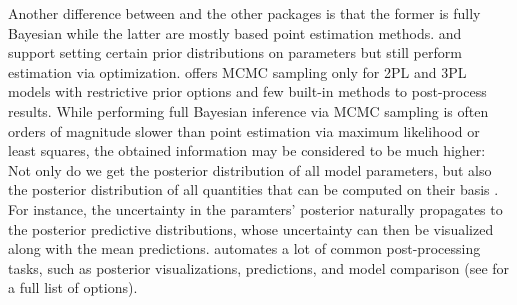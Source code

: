 \documentclass[jss]{jss}
\begin{document}
Another difference between  and the other packages is that the
former is fully Bayesian while the latter are mostly based point
estimation methods.  and  support setting certain
prior distributions on parameters but still perform estimation via
optimization.  offers MCMC sampling only for 2PL and 3PL
models with restrictive prior options and few built-in methods to
post-process results. While performing full Bayesian inference via MCMC
sampling is often orders of magnitude slower than point estimation via
maximum likelihood or least squares, the obtained information may be
considered to be much higher: Not only do we get the posterior
distribution of all model parameters, but also the posterior
distribution of all quantities that can be computed on their basis
\citep{gelman2013}. For instance, the uncertainty in the paramters'
posterior naturally propagates to the posterior predictive
distributions, whose uncertainty can then be visualized along with the
mean predictions.  automates a lot of common post-processing
tasks, such as posterior visualizations, predictions, and model
comparison (see  for a full list of
options).
\end{document}
